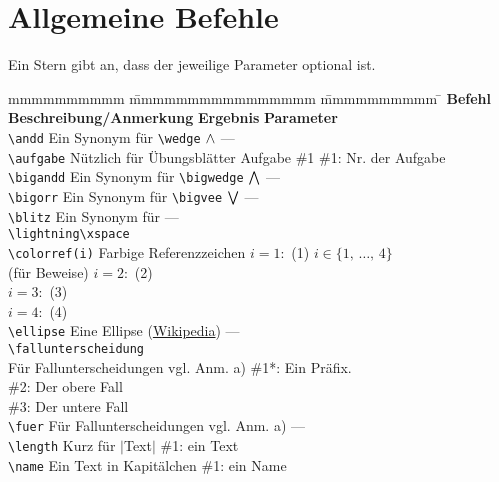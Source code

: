 		\section{Allgemeine Befehle}
			Ein Stern gibt an, dass der jeweilige Parameter optional ist.
			\begin{tabbing}
				mmmmmmmmmm			\= mmmmmmmmmmmmmmmm							\= mmmmmmmmmm			\= \kill
				\textbf{Befehl}		\> \textbf{Beschreibung/Anmerkung}			\> \textbf{Ergebnis}	\> \textbf{Parameter}				\\
				\verb|\andd|		\> Ein Synonym für \verb|\wedge|			\> $\wedge$ 				\> ---								\\
				\verb|\aufgabe|		\> Nützlich für Übungsblätter				\> Aufgabe \#1 			\> \#1: Nr. der Aufgabe 			\\
				\verb|\bigandd|		\> Ein Synonym für \verb|\bigwedge|			\> $\bigwedge$ 			\> --- 								\\
				\verb|\bigorr|		\> Ein Synonym für \verb|\bigvee|			\> $\bigvee$ 			\> --- 								\\
				\verb|\blitz|		\> Ein Synonym für							\> \lightning\xspace 	\> ---								\\
									\> \verb|\lightning\xspace|																				\\
				\verb|\colorref(i)|	\> Farbige Referenzzeichen					\> $i=1:$ (1)	\> $i \in \{1, \, \ldots, \, 4\}$	\\
									\>(\zb für Beweise)							\> $i=2:$ \colorref(2)										\\
									\>											\> $i=3:$ (3)										\\
									\>											\> $i=4:$ (4)										\\
				\verb|\ellipse|		\> Eine Ellipse	 (\href{https://de.wikipedia.org/wiki/Auslassungspunkte}{Wikipedia})
									\> \ellipse				\> ---							\\
				\verb|\fallunterscheidung|\\
									\> Für Fallunterscheidungen					\> vgl. Anm. a)			\> \#1*: Ein Präfix.				\\
									\>											\>						\> \#2: Der obere Fall				\\
									\>											\>						\> \#3: Der untere Fall				\\
				\verb|\fuer|		\> Für Fallunterscheidungen					\> vgl. Anm. a)			\> ---								\\
				\verb|\length|		\> Kurz für $|$Text$|$						\> \length{Text}		\> \#1: ein Text					\\
				\verb|\name|		\> Ein Text in Kapitälchen					\> \name{Der Autor}		\> \#1: ein Name					\\

\end{tabbing}

